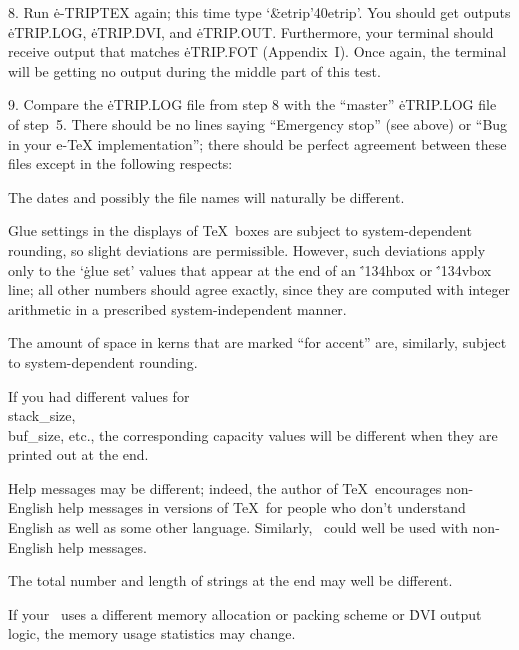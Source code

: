 \item{8.} Run \.{e-TRIPTEX} again; this time type
`\.{\&etrip{\char'40}etrip}'.  You should get outputs \.{eTRIP.LOG},
\.{eTRIP.DVI}, and \.{eTRIP.OUT}.  Furthermore, your terminal should
receive output that matches \.{eTRIP.FOT} (Appendix~I).  Once again, the
terminal will be getting no output during the middle part of this test.

\item{9.} Compare the \.{eTRIP.LOG} file from step 8 with the ``master''
\.{eTRIP.LOG} file of step~5.  There should be no lines saying
``Emergency stop'' (see above) or ``Bug in your e-TeX implementation'';
there should be perfect agreement between these files except in the
following respects:

 The dates and possibly the file names will naturally be
different.

 Glue settings in the displays of \TeX\ boxes are subject
to system-dependent rounding, so slight deviations are permissible.
However, such deviations apply only to the `\.{glue set}' values that
appear at the end of an \.{\char'134hbox} or \.{\char'134vbox} line; all
other numbers should agree exactly, since they are computed with integer
arithmetic in a prescribed system-independent manner.

 The amount of space in kerns that are marked ``for
accent'' are, similarly, subject to system-dependent rounding.

 If you had different values for \\{stack\_size},
\\{buf\_size}, etc., the corresponding capacity values will be different
when they are printed out at the end.

 Help messages may be different; indeed, the author of
\TeX\ encourages non-English help messages in versions of \TeX\ for
people who don't understand English as well as some other language.
Similarly, \eTeX\ could well be used with non-English help messages.

 The total number and length of strings at the end may well
be different.

 If your \eTeX\ uses a different memory allocation or
packing scheme or \.{DVI} output logic, the memory usage statistics may
change.

